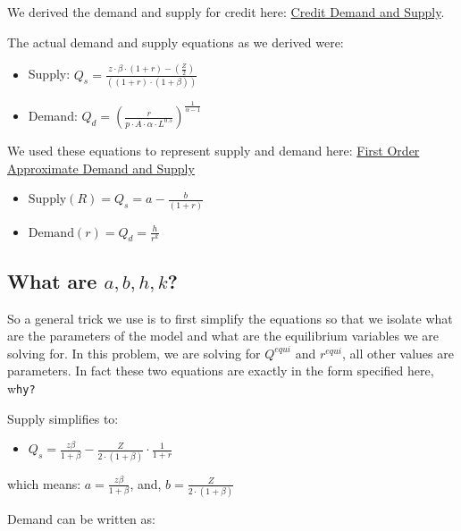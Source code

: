 \documentclass[
]{book}
\providecommand{\tightlist}{%
  \setlength{\itemsep}{0pt}\setlength{\parskip}{0pt}}
\begin{document}
We derived the demand and supply for credit here: \href{https://fanwangecon.github.io/Math4Econ/derivative_application/K_borrow_firm.html}{Credit Demand and
Supply}.

The actual demand and supply equations as we derived were:

\begin{itemize}
\item
  Supply:
  \(Q_s =\frac{z\cdot \beta \cdot (1+r)-(\frac{Z}{2})}{((1+r)\cdot (1+\beta ))}\)
\item
  Demand:
  \(Q_d ={\left(\frac{r}{p\cdot A\cdot \alpha \cdot L^{0.5} }\right)}^{\frac{1}{\alpha -1}}\)
\end{itemize}

We used these equations to represent supply and demand here: \href{https://fanwangecon.github.io/Math4Econ/matrix_application/demand_supply_taylor_approximate.html}{First
Order Approximate Demand and
Supply}

\begin{itemize}
\item
  \(\displaystyle \textrm{Supply}(R)=Q_s =a-\frac{b}{(1+r)}\)
\item
  \(\displaystyle \textrm{Demand}(r)=Q_d =\frac{h}{r^k }\)
\end{itemize}

\hypertarget{what-are-abhk}{%
\subsection{\texorpdfstring{What are \(a,b,h,k\)?}{What are a,b,h,k?}}\label{what-are-abhk}}

So a general trick we use is to first simplify the equations so that we
isolate what are the parameters of the model and what are the
equilibrium variables we are solving for. In this problem, we are
solving for \(Q^{equi}\) and \(r^{equi}\), all other values are parameters.
In fact these two equations are exactly in the form specified here,
w\texttt{hy?}

Supply simplifies to:

\begin{itemize}
\tightlist
\item
  \(\displaystyle Q_s =\frac{z\beta }{1+\beta }-\frac{Z}{2\cdot (1+\beta )}\cdot \frac{1}{1+r}\)
\end{itemize}

which means: \(a=\frac{z\beta }{1+\beta }\), and,
\(b=\frac{Z}{2\cdot (1+\beta )}\)

Demand can be written as:
\end{document}
